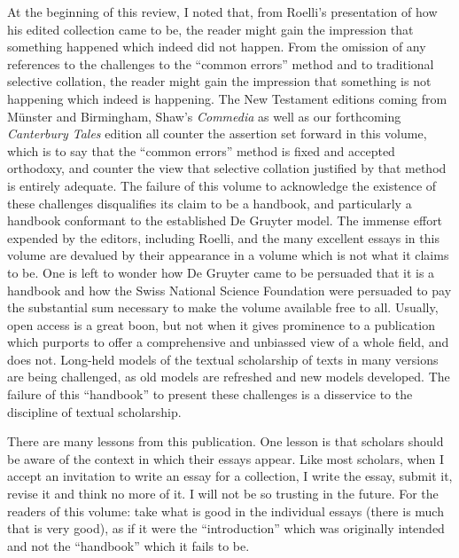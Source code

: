 \begin{review}
At the beginning of this review, I noted that, from Roelli's
presentation of how his edited collection came to be, the reader might
gain the impression that something happened which indeed did not happen.
From the omission of any references to the challenges to the ``common
errors'' method and to traditional selective collation, the reader might
gain the impression that something is not happening which indeed is
happening. The New Testament editions coming from Münster and
Birmingham, Shaw's \emph{Commedia} as well as our forthcoming
\emph{Canterbury Tales} edition all counter the assertion set forward in
this volume, which is to say that the ``common errors'' method is fixed
and accepted orthodoxy, and counter the view that selective collation
justified by that method is entirely adequate. The failure of this
volume to acknowledge the existence of these challenges disqualifies its
claim to be a handbook, and particularly a handbook conformant to the
established De Gruyter model. The immense effort expended by the
editors, including Roelli, and the many excellent essays in this volume
are devalued by their appearance in a volume which is not what it claims
to be. One is left to wonder how De Gruyter came to be persuaded that it
is a handbook and how the Swiss National Science Foundation were
persuaded to pay the substantial sum necessary to make the volume
available free to all. Usually, open access is a great boon, but not
when it gives prominence to a publication which purports to offer a
comprehensive and unbiassed view of a whole field, and does not.
Long-held models of the textual scholarship of texts in many versions
are being challenged, as old models are refreshed and new models
developed. The failure of this ``handbook'' to present these challenges
is a disservice to the discipline of textual scholarship.

There are many lessons from this publication. One lesson is
that scholars should be aware of the context in which their essays
appear. Like most scholars, when I accept an invitation to write an
essay for a collection, I write the essay, submit it, revise it and
think no more of it. I will not be so trusting in the future. For the
readers of this volume: take what is good in the individual essays
(there is much that is very good), as if it were the ``introduction''
which was originally intended and not the ``handbook'' which it fails to
be.


\begin{flushleft}
    \renewcommand*{\mkbibnamefamily}[1]{\textsc{#1}}
    \renewcommand*{\mkbibnamegiven}[1]{\textsc{#1}} 
\printbibliography
\end{flushleft}

\end{review}